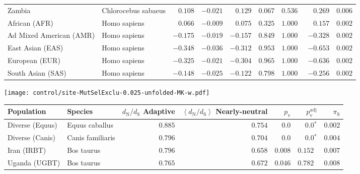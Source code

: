\begin{center}
\begin{adjustbox}{width = 1\textwidth}
\begin{tabular}{|l|l|r|r|r|r|r|r|r|}
            Zambia        & Chlorocebus sabaeus        & $ 0.108$ & $-0.021$  & $ 0.129$ & $ 0.067$ & $ 0.536~~$ & $ 0.269$ & $ 0.006$ \\
            African (AFR)               & Homo sapiens        & $ 0.066$ & $-0.009$  & $ 0.075$ & $ 0.325$ & $ 1.000~~$        & $ 0.157$ & $ 0.002$ \\
            Ad Mixed American (AMR)                 & Homo sapiens        & $-0.175$ & $-0.019$  & $-0.157$ & $ 0.849$ & $ 1.000~~$        & $-0.328$ & $ 0.002$ \\
            East Asian (EAS)              & Homo sapiens        & $-0.348$ & $-0.036$  & $-0.312$ & $ 0.953$ & $ 1.000~~$        & $-0.653$ & $ 0.002$ \\
            European (EUR)              & Homo sapiens        & $-0.325$ & $-0.021$  & $-0.304$ & $ 0.965$ & $ 1.000~~$        & $-0.636$ & $ 0.002$ \\
            South Asian (SAS)              & Homo sapiens        & $-0.148$ & $-0.025$  & $-0.122$ & $ 0.798$ & $ 1.000~~$        & $-0.256$ & $ 0.002$ \\
            \bottomrule
        \end{tabular}
    \end{adjustbox}
    \newpage
    \texttt{[image: control/site-MutSelExclu-0.025-unfolded-MK-w.pdf]}
    \begin{adjustbox}{width = 1\textwidth}
        \begin{tabular}{|l|l|r|r|r|r|r|}
            \toprule
            Population & Species & \specialcell{$d_{\mathrm{N}} / d_{\mathrm{S}}$ \\ Adaptive}                & \specialcell{$\left< d_{\mathrm{N}} / d_{\mathrm{S}} \right>$ \\ Nearly-neutral}                & $p_{\mathrm{v}}$    & $p_{\mathrm{v}}^{\mathrm{adj}}$ & $\pi_{\textrm{S}}$ \\
            \midrule
            Diverse (Equus)                    & Equus caballus          & $ 0.885$ & $ 0.754$ & $0.0$ & $\bm{0.0{^*}}$     & $ 0.002$ \\
            Diverse (Canis)                  & Canis familiaris          & $ 0.796$ & $ 0.704$ & $0.0$ & $\bm{0.0{^*}}$     & $ 0.004$ \\
            Iran (IRBT)               & Bos taurus        & $ 0.796$ & $ 0.658$ & $ 0.008$ & $ 0.152~~$     & $ 0.007$ \\
            Uganda (UGBT)                  & Bos taurus        & $ 0.765$ & $ 0.672$ & $ 0.046$ & $ 0.782~~$     & $ 0.008$ \\

\end{tabular}
\end{adjustbox}
\end{center}
